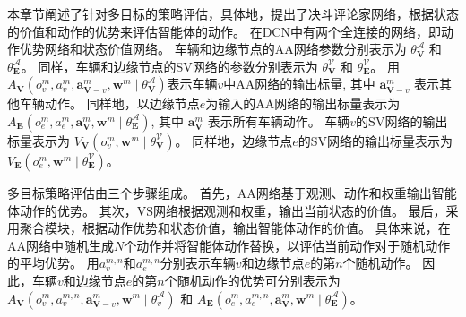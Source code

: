 本章节阐述了针对多目标的策略评估，具体地，提出了决斗评论家网络，根据状态的价值和动作的优势来评估智能体的动作。
在DCN中有两个全连接的网络，即动作优势网络和状态价值网络。
车辆和边缘节点的AA网络参数分别表示为 $\theta_{\mathbf{V}}^{\mathscr{A}}$ 和 $\theta_{\mathbf{E}}^{\mathscr{A}}$。
同样，车辆和边缘节点的SV网络的参数分别表示为 $\theta_{\mathbf{V}}^{\mathscr{V}}$ 和 $\theta_{\mathbf{E}}^{\mathscr{V}}$。
用$A_{\mathbf{V}}\left({o}_{v}^{m},  {a}_{v}^{m}, \boldsymbol{a}_{\boldsymbol{\mathbf{V}}-v}^{m}, \boldsymbol{w}^{m} \mid \theta_{\mathbf{V}}^{\mathscr{A}} \right)$表示车辆$v$中AA网络的输出标量, 其中 $\boldsymbol{a}_{\boldsymbol{\mathbf{V}}-v}^{m}$ 表示其他车辆动作。
同样地，以边缘节点$e$为输入的AA网络的输出标量表示为 $A_{\mathbf{E}}\left({o}_{e}^{m},  {a}_{e}^{m}, \boldsymbol{a}_{\boldsymbol{\mathbf{V}}}^{m}, \boldsymbol{w}^{m} \mid \theta_{\mathbf{E}}^{\mathscr{A}} \right)$, 其中 $\boldsymbol{a}_{\boldsymbol{\mathbf{V}}}^{m}$ 表示所有车辆动作。
车辆$v$的SV网络的输出标量表示为 $V_{\mathbf{V}}\left({o}_{v}^{m}, \boldsymbol{w}^{m} \mid \theta_{\mathbf{V}}^{\mathscr{V}} \right)$。
同样地，边缘节点$e$的SV网络的输出标量表示为 $V_{\mathbf{E}}\left({o}_{e}^{m}, \boldsymbol{w}^{m} \mid \theta_{\mathbf{E}}^{\mathscr{V}} \right)$。

多目标策略评估由三个步骤组成。
首先，AA网络基于观测、动作和权重输出智能体动作的优势。
其次，VS网络根据观测和权重，输出当前状态的价值。
最后，采用聚合模块，根据动作优势和状态价值，输出智能体动作的价值。
具体来说，在AA网络中随机生成$N$个动作并将智能体动作替换，以评估当前动作对于随机动作的平均优势。
用${a}_{v}^{m, n}$和${a}_{e}^{m, n}$分别表示车辆$v$和边缘节点$e$的第$n$个随机动作。
因此，车辆$v$和边缘节点$e$的第$n$个随机动作的优势可分别表示为 $A_{\mathbf{V}}\left({o}_{v}^{m},  {a}_{v}^{m, n}, \boldsymbol{a}_{\boldsymbol{\mathbf{V}}-v}^{m}, \boldsymbol{w}^{m} \mid \theta_{v}^{\mathscr{A}} \right)$ 和 $A_{\mathbf{E}}\left({o}_{e}^{m},  {a}_{e}^{m, n}, \boldsymbol{a}_{\boldsymbol{\mathbf{V}}}^{m}, \boldsymbol{w}^{m} \mid \theta_{\mathbf{E}}^{\mathscr{A}} \right)$。

